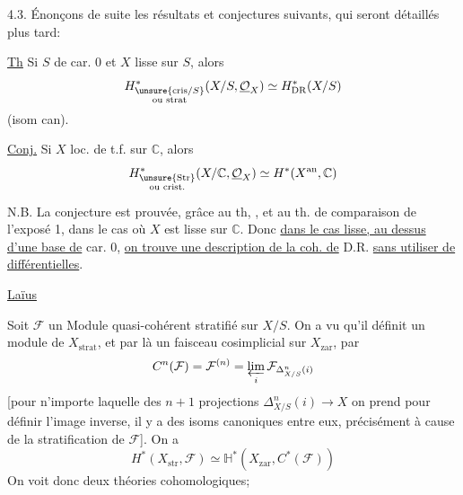 4.3. Énonçons de suite les résultats et conjectures suivants, qui seront  détaillés plus tard:

\uline{Th} Si $S$ de car. 0 et $X$ lisse sur $S$, alors
\[
H^*_{\substack{\unsure{\mathrm{cris}/S}\\\text{ou strat}}}
(X/S,\underline{\mathcal{O}}_X)\simeq H^*_{\mathrm{DR}}(X/S)
\]
(isom can).
\deleted{\unsure{on a} $\unsure{f}=\mathbb{R}f_*(\mathcal{O}_X)$ \unsure{puis} $\uline{\unsure{H^i=0}}$, et
\[
(\mathbb{R}\unsure{f_{\mathrm{str}*}|f_*}(\mathcal{O}_X)^{\unsure{\mathrm{an}|\mathrm{ab}}}
\simeq\mathbb{R}f_*(\Omega^{\unsure{\bullet}}_{X/S})\quad ....]
\]}



\uline{Conj.} Si $X$ loc. de t.f. sur $\mathbb{C}$, alors
\[
H^*_{\substack{\unsure{\mathrm{Str}}\\\text{ou crist.}}}
(X/\mathbb{C},\underline{\mathcal{O}}_X)
\simeq H^*(X^{\mathrm{an}},\mathbb{C})
\]

N.B. La conjecture est prouvée, grâce au th, , et au th. de comparaison de l'exposé 1, dans le cas où $X$ est lisse sur $\mathbb{C}$.
Donc \uline{dans le cas lisse, au dessus d'une base de} car. 0, \uline{on trouve une description de la coh. de} D.R. \uline{sans utiliser de différentielles}.


\uline{Laïus}

Soit $\mathcal{F}$ un Module quasi-cohérent stratifié sur $X/S$.
On a vu qu'il définit un module de $X_{\mathrm{strat}}$, et par là un faisceau cosimplicial
sur $X_{\mathrm{zar}}$, par
\[
C^n(\mathcal{F})=\mathcal{F}^{(n)}
=\varprojlim_i\mathcal{F}_{\Delta^n_{X/S}(i)}
\]
[pour n'importe laquelle des $n+1$ projections $\Delta^n_{X/S}(i)\to X$ on prend pour définir l'image inverse, il y a des isoms canoniques entre eux, précisément à cause de la stratification de $\mathcal{F}$].
On a
\[
\boxed{H^*(X_{\mathrm{str}},\mathcal{F})
\simeq\mathbb{H}^*(X_{\mathrm{zar}},C^*(\mathcal{F}))}
\]
On voit donc deux théories cohomologiques;

